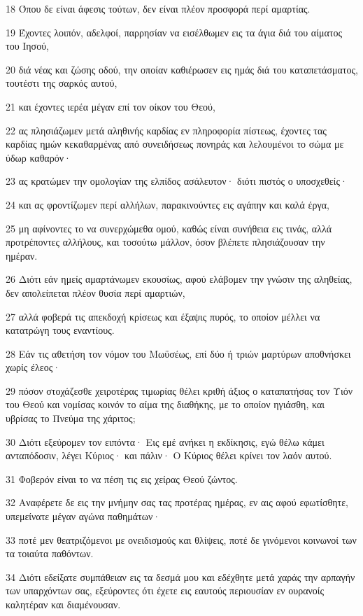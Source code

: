 \par 18 Όπου δε είναι άφεσις τούτων, δεν είναι πλέον προσφορά περί αμαρτίας.
\par 19 Έχοντες λοιπόν, αδελφοί, παρρησίαν να εισέλθωμεν εις τα άγια διά του αίματος του Ιησού,
\par 20 διά νέας και ζώσης οδού, την οποίαν καθιέρωσεν εις ημάς διά του καταπετάσματος, τουτέστι της σαρκός αυτού,
\par 21 και έχοντες ιερέα μέγαν επί τον οίκον του Θεού,
\par 22 ας πλησιάζωμεν μετά αληθινής καρδίας εν πληροφορία πίστεως, έχοντες τας καρδίας ημών κεκαθαρμένας από συνειδήσεως πονηράς και λελουμένοι το σώμα με ύδωρ καθαρόν·
\par 23 ας κρατώμεν την ομολογίαν της ελπίδος ασάλευτον· διότι πιστός ο υποσχεθείς·
\par 24 και ας φροντίζωμεν περί αλλήλων, παρακινούντες εις αγάπην και καλά έργα,
\par 25 μη αφίνοντες το να συνερχώμεθα ομού, καθώς είναι συνήθεια εις τινάς, αλλά προτρέποντες αλλήλους, και τοσούτω μάλλον, όσον βλέπετε πλησιάζουσαν την ημέραν.
\par 26 Διότι εάν ημείς αμαρτάνωμεν εκουσίως, αφού ελάβομεν την γνώσιν της αληθείας, δεν απολείπεται πλέον θυσία περί αμαρτιών,
\par 27 αλλά φοβερά τις απεκδοχή κρίσεως και έξαψις πυρός, το οποίον μέλλει να κατατρώγη τους εναντίους.
\par 28 Εάν τις αθετήση τον νόμον του Μωϋσέως, επί δύο ή τριών μαρτύρων αποθνήσκει χωρίς έλεος·
\par 29 πόσον στοχάζεσθε χειροτέρας τιμωρίας θέλει κριθή άξιος ο καταπατήσας τον Υιόν του Θεού και νομίσας κοινόν το αίμα της διαθήκης, με το οποίον ηγιάσθη, και υβρίσας το Πνεύμα της χάριτος;
\par 30 Διότι εξεύρομεν τον ειπόντα· Εις εμέ ανήκει η εκδίκησις, εγώ θέλω κάμει ανταπόδοσιν, λέγει Κύριος· και πάλιν· Ο Κύριος θέλει κρίνει τον λαόν αυτού.
\par 31 Φοβερόν είναι το να πέση τις εις χείρας Θεού ζώντος.
\par 32 Αναφέρετε δε εις την μνήμην σας τας προτέρας ημέρας, εν αις αφού εφωτίσθητε, υπεμείνατε μέγαν αγώνα παθημάτων·
\par 33 ποτέ μεν θεατριζόμενοι με ονειδισμούς και θλίψεις, ποτέ δε γινόμενοι κοινωνοί των τα τοιαύτα παθόντων.
\par 34 Διότι εδείξατε συμπάθειαν εις τα δεσμά μου και εδέχθητε μετά χαράς την αρπαγήν των υπαρχόντων σας, εξεύροντες ότι έχετε εις εαυτούς περιουσίαν εν ουρανοίς καλητέραν και διαμένουσαν.
